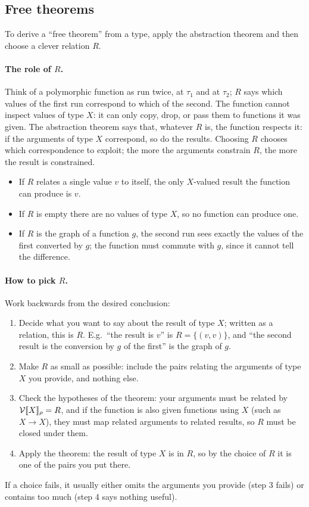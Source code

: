 \subsection{Free theorems}
 
To derive a ``free theorem'' from a type, apply the abstraction theorem and then choose
a clever relation $R$.
 
\paragraph{The role of $R$.} Think of a polymorphic function as run twice, at $\tau_1$
and at $\tau_2$; $R$ says which values of the first run correspond to which of the
second. The function cannot inspect values of type $X$: it can only copy, drop, or pass
them to functions it was given. The abstraction theorem says that, whatever $R$ is, the
function respects it: if the arguments of type $X$ correspond, so do the results.
Choosing $R$ chooses which correspondence to exploit; the more the arguments constrain
$R$, the more the result is constrained.
\begin{itemize}
  \item If $R$ relates a single value $v$ to itself, the only $X$-valued result the
        function can produce is $v$.
  \item If $R$ is empty there are no values of type $X$, so no function can produce one.
  \item If $R$ is the graph of a function $g$, the second run sees exactly the values of
        the first converted by $g$; the function must commute with $g$, since it cannot
        tell the difference.
\end{itemize}
 
\paragraph{How to pick $R$.} Work backwards from the desired conclusion:
\begin{enumerate}
  \item Decide what you want to say about the result of type $X$; written as a relation,
        this is $R$. E.g.\ ``the result is $v$'' is $R = \{(v, v)\}$, and ``the second
        result is the conversion by $g$ of the first'' is the graph of $g$.
  \item Make $R$ as small as possible: include the pairs relating the arguments of type
        $X$ you provide, and nothing else.
  \item Check the hypotheses of the theorem: your arguments must be related by
        $\mathcal{V}[\![X]\!]_\rho = R$, and if the function is also given functions using $X$ (such as
        $X \to X$), they must map related arguments to related results, so $R$ must be
        closed under them.
  \item Apply the theorem: the result of type $X$ is in $R$, so by the choice of $R$ it
        is one of the pairs you put there.
\end{enumerate}
If a choice fails, it usually either omits the arguments you provide (step 3 fails) or
contains too much (step 4 says nothing useful).
 
